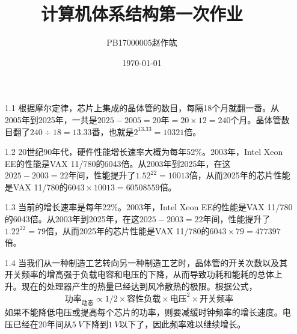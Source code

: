 \documentclass[UTF8,zihao=-4]{ctexart}
\title{\heiti 计算机体系结构\quad 第一次作业}
\author{\CJKfamily{namekai} PB17000005\quad 赵作竑}
\date{\kaishu \today}
\begin{document}
	\maketitle
	\begin{itemize}
		\item[1.1] 根据摩尔定律，芯片上集成的晶体管的数目，每隔18个月就翻一番。从2005年到2025年，一共是$2025-2005=20$年$=20\times 12=240$个月。晶体管数目翻了$240\div 18=13.33$番，也就是$2^{13.33}=10321$倍。
		\item[1.2] 20世纪90年代，硬件性能增长速率大概为每年52\%。2003年，Intel Xeon EE的性能是VAX 11/780的6043倍。从2003年到2025年，在这$2025-2003=22$年间，性能提升了$1.52^{22}=10013$倍，从而2025年的芯片性能是VAX 11/780的$6043\times 10013=60508559$倍。
		\item[1.3] 当前的增长速率是每年22\%。2003年，Intel Xeon EE的性能是VAX 11/780的6043倍。从2003年到2025年，在这$2025-2003=22$年间，性能提升了$1.22^{22}=79$倍，从而2025年的芯片性能是VAX 11/780的$6043\times 79=477397$倍。
		\item[1.4] 当我们从一种制造工艺转向另一种制造工艺时，晶体管的开关次数以及其开关频率的增高强于负载电容和电压的下降，从而导致功耗和能耗的总体上升。现在的处理器产生的热量已经达到风冷散热的极限。根据公式，
		\begin{equation*}
			\text{功率}_\text{动态}\varpropto 1/2\times \text{容性负载}\times \text{电压}^2\times \text{开关频率}
		\end{equation*} 
		如果不能降低电压或提高每个芯片的功率，则要减缓时钟频率的增长速度。电压已经在20年间从$\SI{5}{V}$下降到$\SI{1}{V}$以下了，因此频率难以继续增长。


\end{itemize}
\end{document}
